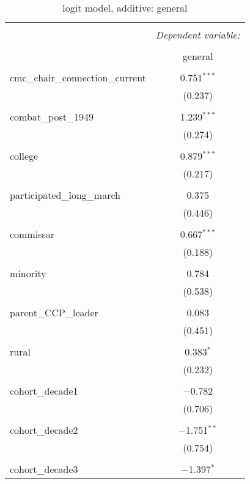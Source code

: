 \documentclass[12pt,letterpaper]{article}
\begin{document}
\begin{table}[!htbp] \centering 
	\caption{logit model, additive: general} 
	\label{} 
	\rmfamily
	\scriptsize
	\begin{tabular}{@{\extracolsep{5pt}}lc} 
		\\[-1.8ex]\hline 
		\hline \\[-1.8ex] 
		& \multicolumn{1}{c}{\textit{Dependent variable:}} \\ 
		\cline{2-2} 
		\\[-1.8ex] & general \\ 
		\hline \\[-1.8ex] 
		cmc\_chair\_connection\_current & 0.751$^{***}$ \\ 
		& (0.237) \\ 
		& \\ 
		combat\_post\_1949 & 1.239$^{***}$ \\ 
		& (0.274) \\ 
		& \\ 
		college & 0.879$^{***}$ \\ 
		& (0.217) \\ 
		& \\ 
		participated\_long\_march & 0.375 \\ 
		& (0.446) \\ 
		& \\ 
		commissar & 0.667$^{***}$ \\ 
		& (0.188) \\ 
		& \\ 
		minority & 0.784 \\ 
		& (0.538) \\ 
		& \\ 
		parent\_CCP\_leader & 0.083 \\ 
		& (0.451) \\ 
		& \\ 
		rural & 0.383$^{*}$ \\ 
		& (0.232) \\ 
		& \\ 
		cohort\_decade1 & $-$0.782 \\ 
		& (0.706) \\ 
		& \\ 
		cohort\_decade2 & $-$1.751$^{**}$ \\ 
		& (0.754) \\ 
		& \\ 
		cohort\_decade3 & $-$1.397$^{*}$ \\ 

\end{tabular}
\end{table}
\end{document}
